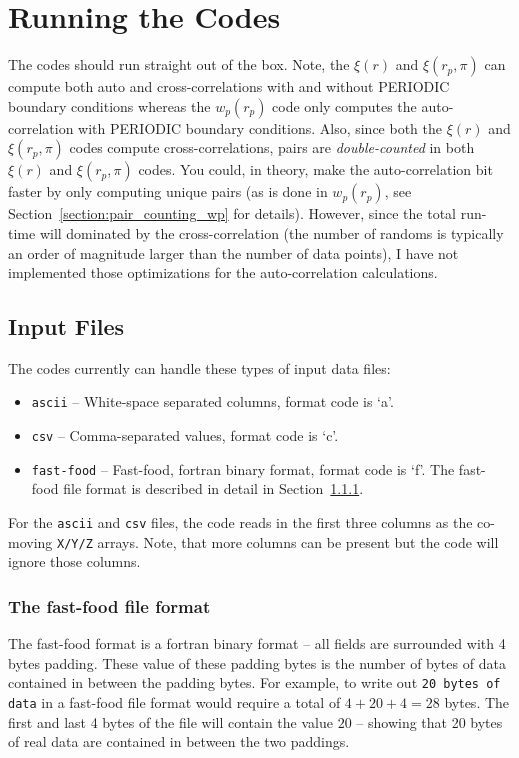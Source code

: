 \documentclass[12pt,titlepage,justified]{article}
\let\stdsection\section
\newcommand{\xir}{\ensuremath{{\xi(r)}}\xspace}
\newcommand{\wprp}{\ensuremath{{w_p(r_p)}}\xspace}
\newcommand{\xirppi}{\ensuremath{{\xi(r_p,\pi)}}\xspace}
\begin{document}
\stdsection{Running the Codes}
The codes should run straight out of the box. Note, the \xir and \xirppi can compute both auto and cross-correlations with and without PERIODIC boundary conditions whereas the \wprp code 
only computes the auto-correlation with PERIODIC boundary conditions. Also, since both the \xir and \xirppi codes compute cross-correlations, pairs are {\em double-counted} in both 
\xir and \xirppi codes. You could, in theory, make the auto-correlation bit faster by only computing unique pairs (as is done in \wprp, see Section~\ref{section:pair_counting_wp} 
for details). However, since the total run-time will dominated by the cross-correlation (the number of randoms is typically an order of magnitude larger than the number 
of data points), I have not implemented those optimizations for the auto-correlation calculations. 
\subsection{Input Files}
The codes currently can handle these types of input data files:
\begin{itemize}
\item \texttt{ascii} -- White-space separated columns, format code is `a'.
\item \texttt{csv}   -- Comma-separated values, format code is `c'.
\item \texttt{fast-food} -- Fast-food, fortran binary format, format code is `f'.
The fast-food file format is described in detail in Section~\ref{section:fastfood}.
\end{itemize}
For the \texttt{ascii} and \texttt{csv} files, the code reads in the first three columns as the co-moving \texttt{X/Y/Z} arrays. Note, that more columns 
can be present but the code will ignore those columns. 

\subsubsection{The fast-food file format}\label{section:fastfood}
The fast-food format is a fortran binary format -- all fields are surrounded with 4 bytes padding. These value of these padding bytes 
is the number of bytes of data contained in between the padding bytes. For example, to write out \texttt{20 bytes of data} in 
a fast-food file format would require a total of $4+20+4=28$ bytes. The first and last 4 bytes of the file will contain the value $20$ -- 
showing that 20 bytes of real data are contained in between the two paddings. 
\end{document}
